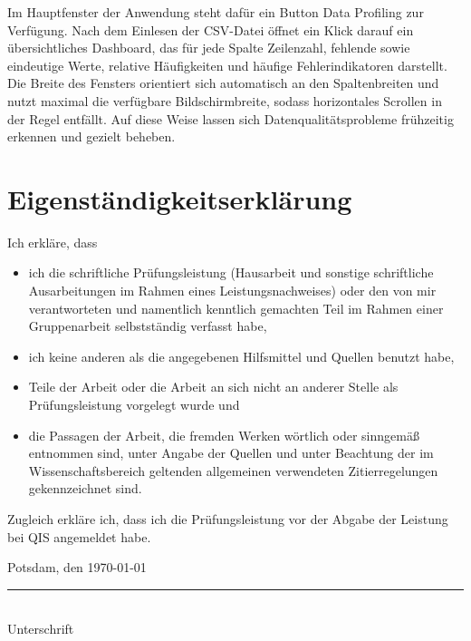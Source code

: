 \documentclass[
    a4paper,
    12pt,
    headinclude=true,
    BCOR=10mm,
]{scrreprt}
\begin{document}
Im Hauptfenster der Anwendung steht dafür ein Button \glqq Data Profiling\grqq{} zur Verfügung. Nach dem Einlesen der CSV-Datei öffnet ein Klick darauf ein übersichtliches Dashboard, das für jede Spalte Zeilenzahl, fehlende sowie eindeutige Werte, relative Häufigkeiten und häufige Fehlerindikatoren darstellt. Die Breite des Fensters orientiert sich automatisch an den Spaltenbreiten und nutzt maximal die verfügbare Bildschirmbreite, sodass horizontales Scrollen in der Regel entfällt. Auf diese Weise lassen sich Datenqualitätsprobleme frühzeitig erkennen und gezielt beheben.

\newpage
{}
\chapter*{Eigenständigkeitserklärung}
Ich erkläre, dass
\begin{itemize}
    \item ich die schriftliche Prüfungsleistung (Hausarbeit und sonstige schriftliche Ausarbeitungen im Rahmen eines Leistungsnachweises) oder den von mir verantworteten und namentlich kenntlich gemachten Teil im Rahmen einer Gruppenarbeit selbstständig verfasst habe,
    \item ich keine anderen als die angegebenen Hilfsmittel und Quellen benutzt habe,
    \item Teile der Arbeit oder die Arbeit an sich nicht an anderer Stelle als Prüfungsleistung vorgelegt wurde und
    \item die Passagen der Arbeit, die fremden Werken wörtlich oder sinngemäß entnommen sind, unter Angabe der Quellen und unter Beachtung der im Wissenschaftsbereich geltenden allgemeinen verwendeten Zitierregelungen gekennzeichnet sind.
\end{itemize}

Zugleich erkläre ich, dass ich die Prüfungsleistung vor der Abgabe der Leistung bei QIS angemeldet habe.

\vspace{2cm}

\noindent
Potsdam, den \today

\vspace{2cm}

\noindent
\rule{6cm}{0.4pt}\\
Unterschrift

\printbibliography
\newpage
\appendix
\end{document}
